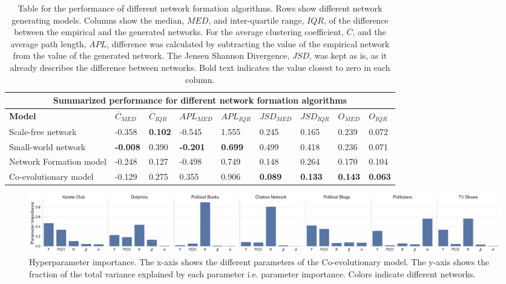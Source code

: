 \documentclass[11pt]{article}
\begin{document}
\begin{table}[H]
\begin{center}
    
\begin{tabular}{ |p{4.2cm}||p{1cm}|p{0.9cm}|p{1.35cm}|p{1.3cm}|p{1.35cm}|p{1.2cm}|p{0.93cm}|p{0.9cm}|}
    \hline
    \multicolumn{9}{|c|}{Summarized performance for different network formation algorithms} \\
    \hline
    \bf{Model} & $\overline{C}_{MED}$ & $\overline{C}_{IQR}$ & $APL_{MED}$ & $APL_{IQR}$ & $JSD_{MED}$ & $JSD_{IQR}$ & $O_{MED}$ & $O_{IQR}$\\
    \hline
    Scale-free network   & -0.358    & \bf{0.102} &   -0.545	 &   1.555 &   0.245	 & 0.165 & 0.239 & 0.072\\
    Small-world network &   \bf{-0.008}  & 0.390   & \bf{-0.201}	&   \bf{0.699} &   0.499 & 0.418 & 0.236 & 0.071\\
    Network Formation model   &-0.248		 & 0.127	&  -0.498	 & 0.749 &   0.148 & 0.264 & 0.170 & 0.104\\
    Co-evolutionary model & -0.129 & 0.275 & 0.355	 & 0.906 & \bf{0.089} & \bf{0.133} & \bf{0.143} & \bf{0.063} \\
    \hline
\end{tabular}
\end{center}
\caption{Table for the performance of different network formation algorithms. Rows show different network generating models. Columns show the median, $MED$, and inter-quartile range, $IQR$, of the difference between the empirical and the generated networks. For the average clustering coefficient, $\overline{C}$, and the average path length, $APL$, difference was calculated by subtracting the value of the empirical network from the value of the generated network. The Jensen Shannon Divergence, $JSD$, was kept as is, as it already describes the difference between networks. Bold text indicates the value closest to zero in each column.}
\label{table:performance}
\end{table}

\begin{figure}[H]
    \centering
    \includegraphics[width=.99\linewidth]{../plots/overall/Parameter_Importance.pdf}
  \caption{Hyperparameter importance. The x-axis shows the different parameters of the Co-evolutionary model. The y-axis shows the fraction of the total variance explained by each parameter i.e. parameter importance. Colors indicate different networks.}
  \label{fig:eval_importance}
\end{figure}
\end{document}
